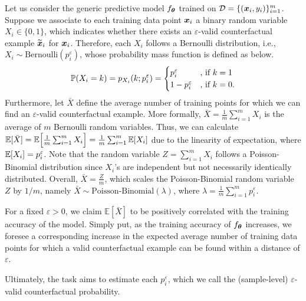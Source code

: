 Let us consider the generic predictive model $f_{\boldsymbol{\theta}}$ trained on $\mathcal{D} = \{(\boldsymbol{x}_i, y_i)\}_{i=1}^m$.
Suppose we associate to each training data point $\boldsymbol{x}_i$ a binary random variable $X_i\in \{0,1\}$, which indicates whether there exists an $\varepsilon$-valid counterfactual example $\widetilde{\boldsymbol{x}}_i$ for $\boldsymbol{x}_i$. 
Therefore, each $X_i$ follows a Bernoulli distribution, i.e., $X_i \sim \text{Bernoulli}(p_i^{\varepsilon})$, whose probability mass function is defined as below.
\begin{equation}
\mathbb{P}(X_i = k) = p_{X_i}(k;p_i^{\varepsilon}) = \begin{cases} p_i^{\varepsilon} &\text{, if }k=1
\\ 
1-p_i^{\varepsilon} &\text{, if } k=0.
\end{cases}
\end{equation}
Furthermore, let $\bar{X}$ define the average number of training points for which we can find an $\varepsilon$-valid counterfactual example. More formally, $\bar{X}=\frac{1}{m}\sum_{i=1}^m X_i$ is the average of $m$ Bernoulli random variables. Thus, we can calculate $\mathbb{E}[\bar{X}] = \mathbb{E}\Big[ \frac{1}{m}\sum_{i=1}^m X_i\Big] = \frac{1}{m}\sum_{i=1}^m \mathbb{E}[X_i]$ due to the linearity of expectation, where $\mathbb{E}[X_i] = p_i^{\varepsilon}$. 
Note that the random variable $Z=\sum_{i=1}^m X_i$ follows a Poisson-Binomial distribution since $X_i$'s are independent but not necessarily identically distributed.
Overall, $\bar{X} = \frac{Z}{m}$, which scales the Poisson-Binomial random variable $Z$ by $1/m$, namely $\bar{X} \sim \text{Poisson-Binomial}(\lambda)$, where $\lambda= \frac{1}{m} \sum_{i=1}^m p_i^{\varepsilon}$.

For a fixed $\varepsilon > 0$, we claim $\mathbb{E}[\bar{X}]$ to be positively correlated with the training accuracy of the model. Simply put, as the training accuracy of $f_{\boldsymbol{\theta}}$ increases, we foresee a corresponding increase in the expected average number of training data points for which a valid counterfactual example can be found within a distance of $\varepsilon$.

Ultimately, the task aims to estimate each $p_i^{\varepsilon}$, which we call the (sample-level) $\varepsilon$-valid counterfactual probability.

